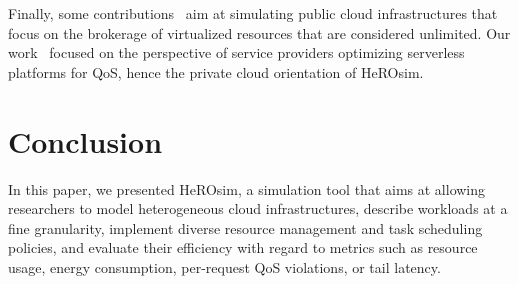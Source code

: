 Finally, some contributions~\cite{nunez_icancloud_2012, mahmoudiSimFaaSPerformanceSimulator2021} aim at simulating public cloud infrastructures that focus on the brokerage of virtualized resources that are considered unlimited. Our work~\cite{herofake, herocache} focused on the perspective of service providers optimizing serverless platforms for QoS, hence the private cloud orientation of HeROsim.


\section{Conclusion}
\label{section:herosim-conclusion}

In this paper, we presented HeROsim, a simulation tool that aims at allowing researchers to model heterogeneous cloud infrastructures, describe workloads at a fine granularity, implement diverse resource management and task scheduling policies, and evaluate their efficiency with regard to metrics such as resource usage, energy consumption, per-request QoS violations, or tail latency. %


